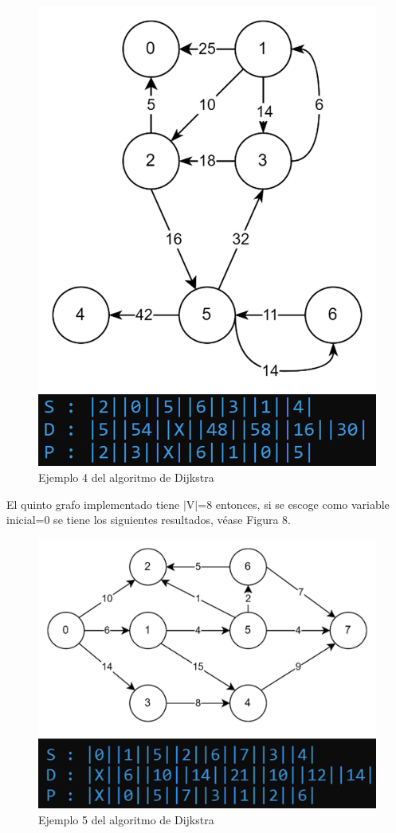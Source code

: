 \documentclass[12pt,twoside]{article}
\begin{document}
    \begin{figure}[H]
        \centering
        \includegraphics{imagenes/Imagen4.png}
        \caption{Ejemplo 4 del algoritmo de Dijkstra}
    \end{figure}
    El quinto grafo implementado tiene $|$V$|$=8 entonces, si se escoge como variable inicial=0 se tiene los siguientes resultados, v\'ease Figura 8.
    \begin{figure}[H]
        \centering
        \includegraphics{imagenes/Imagen5.png}
        \caption{Ejemplo 5 del algoritmo de Dijkstra}
    \end{figure}
\end{document}
